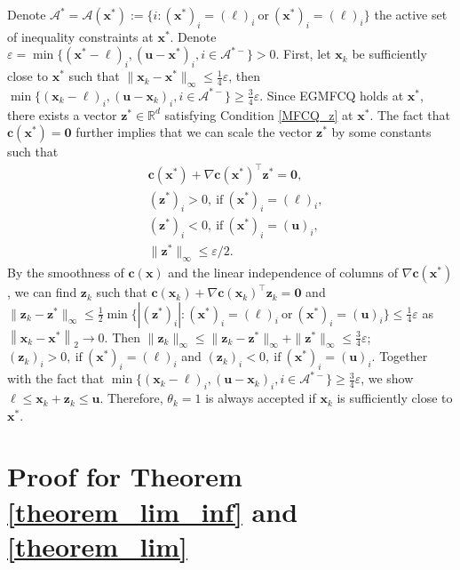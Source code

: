 \documentclass[aos]{imsart}
\numberwithin{equation}{section}
\theoremstyle{plain}
\begin{document}
\begin{appendix}
Denote $\mathcal{A}^{*} = \mathcal{A}(\bm{x}^{*}):= \{i: (\bm{x}^{*})_i = (\bm{\ell})_i~\text{or}~(\bm{x}^{*})_i = (\bm{\ell})_i\}$ the active set of inequality constraints at $\bm{x}^{*}$. Denote $\varepsilon = \min \{ (\bm{x}^{*}-\bm{\ell})_i, (\bm{u} - \bm{x}^{*})_i, i \in \mathcal{A}^{*-}\} > 0$. First, let $\bm{x}_k$ be sufficiently close to $\bm{x}^{*}$ such that $\|\bm{x}_k - \bm{x}^{*}\|_{\infty} \leq \frac{1}{4} \varepsilon$, then $\min \{ (\bm{x}_{k}-\bm{\ell})_i, (\bm{u} - \bm{x}_{k})_i, i \in \mathcal{A}^{*-}\} \geq \frac{3}{4}\varepsilon$. Since EGMFCQ holds at $\bm{x}^{*}$, there exists a vector $\bm{z}^{*} \in \mathbb{R}^{d}$ satisfying Condition \eqref{MFCQ_z} at $\bm{x}^{*}$. The fact that $\bm{c}(\bm{x}^{*}) = \bm{0}$ further implies that we can scale the vector $\bm{z}^{*}$ by some constants such that 
    \begin{equation*}
        \begin{split}
            & \bm{c}(\bm{x}^{*}) + \nabla \bm{c}(\bm{x}^{*})^{\top} \bm{z}^{*} = \bm{0},\\
            & (\bm{z}^{*})_i >0,~\text{if}~(\bm{x}^{*})_{i} = (\bm{\ell})_i,\\
            & (\bm{z}^{*})_i < 0,~\text{if}~(\bm{x}^{*})_{i} = (\bm{u})_i,\\
            & \|\bm{z}^{*}\|_{\infty} \leq \varepsilon/2.
        \end{split}
    \end{equation*}
    By the smoothness of $\bm{c}(\bm{x})$ and the linear independence of columns of $\nabla \bm{c}(\bm{x}^{*})$, we can find $\bm{z}_k$ such that $\bm{c}(\bm{x}_k) + \nabla \bm{c}(\bm{x}_k)^{\top} \bm{z}_k = \bm{0}$ and $\|\bm{z}_k - \bm{z}^{*}\|_{\infty} \leq \frac{1}{2} \min\{|(\bm{z}^{*})_{i}|:(\bm{x}^{*})_{i} = (\bm{\ell})_i ~\text{or}~ (\bm{x}^{*})_{i} = (\bm{u})_i \} \leq \frac{1}{4} \varepsilon$ as $\left\| \bm{x}_k - \bm{x}^{*} \right\|_2 \to 0$. Then $\|\bm{z}_k \|_{\infty} \leq \|\bm{z}_k - \bm{z}^{*}\|_{\infty} + \|\bm{z}^{*}\|_{\infty} \leq \frac{3}{4} \varepsilon$; $(\bm{z}_{k})_i >0,~\text{if}~(\bm{x}^{*})_{i} = (\bm{\ell})_i$ and $(\bm{z}_{k})_i < 0,~\text{if}~(\bm{x}^{*})_{i} = (\bm{u})_i$. Together with the fact that $\min \{ (\bm{x}_{k}-\bm{\ell})_i, (\bm{u} - \bm{x}_{k})_i, i \in \mathcal{A}^{*-}\} \geq \frac{3}{4}\varepsilon$, we show $\bm{\ell} \leq \bm{x}_k + \bm{z}_k  \leq \bm{u}$. Therefore, $\theta_k = 1$ is always accepted if $\bm{x}_k$ is sufficiently close to $\bm{x}^{*}$.


\newpage
\section{Proof for Theorem \ref{theorem_lim_inf} and \ref{theorem_lim}}
\label{sec:appendix2}


\end{appendix}
\end{document}
